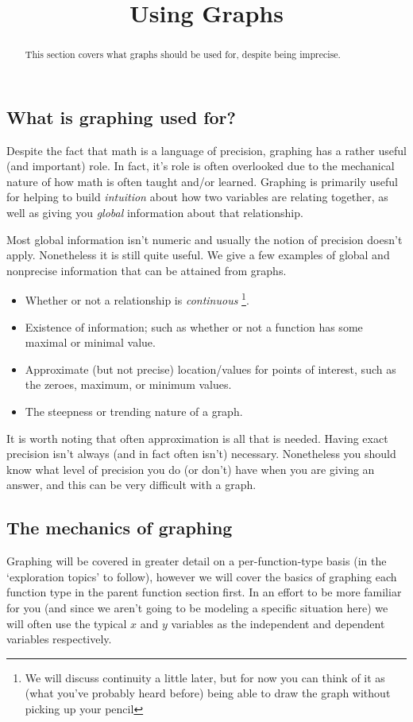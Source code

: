 \documentclass{ximeraXloud}
\title{Using Graphs}
\begin{document}
\begin{abstract}
    This section covers what graphs should be used for, despite being imprecise.
\end{abstract}
\maketitle

\subsection*{What is graphing used for?}
    
    Despite the fact that math is a language of precision, graphing has a rather useful (and important) role. In fact, it's role is often overlooked due to the mechanical nature of how math is often taught and/or learned. Graphing is primarily useful for helping to build \textit{intuition} about how two variables are relating together, as well as giving you \textit{global} information about that relationship.
    
    Most global information isn't numeric and usually the notion of precision doesn't apply. Nonetheless it is still quite useful. We give a few examples of global and nonprecise information that can be attained from graphs. 
    \begin{itemize}
        \item Whether or not a relationship is \textit{continuous}%
        \footnote{
        We will discuss continuity a little later, but for now you can think of it as (what you've probably heard before) being able to draw the graph without picking up your pencil
        }.
        \item Existence of information; such as whether or not a function has some maximal or minimal value.
        \item Approximate (but not precise) location/values for points of interest, such as the zeroes, maximum, or minimum values.
        \item The steepness or trending nature of a graph.
     \end{itemize}
     It is worth noting that often approximation is all that is needed. Having exact precision isn't always (and in fact often isn't) necessary. Nonetheless you should know what level of precision you do (or don't) have when you are giving an answer, and this can be very difficult with a graph.
    
\subsection*{The mechanics of graphing}
    Graphing will be covered in greater detail on a per-function-type basis (in the `exploration topics' to follow), however we will cover the basics of graphing each function type in the parent function section first. In an effort to be more familiar for you (and since we aren't going to be modeling a specific situation here) we will often use the typical $x$ and $y$ variables as the independent and dependent variables respectively.
\end{document}
